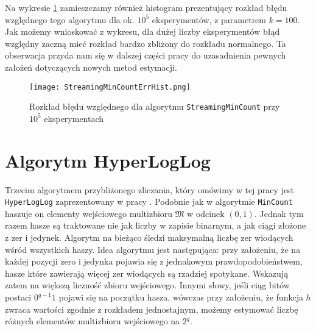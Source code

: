 Na wykresie \ref{fig:str_mincount_hist} zamieszczamy również histogram prezentujący rozkład błędu względnego tego algorytmu dla ok. $10^5$ eksperymentów, z parametrem $k=100$. Jak możemy wnioskować z wykresu, dla dużej liczby eksperymentów błąd względny zaczną mieć rozkład bardzo zbliżony do rozkładu normalnego. Ta obserwacja przyda nam się w dalszej części pracy do uzasadnienia pewnych założeń dotyczących nowych metod estymacji.

\begin{figure}[h!]
	\texttt{[image: StreamingMinCountErrHist.png]}
	\centering
	\caption{Rozkład błędu względnego dla algorytmu \texttt{StreamingMinCount} przy $10^5$ eksperymentach}
	\label{fig:str_mincount_hist}
\end{figure}

\section{Algorytm HyperLogLog}
\label{hll}

Trzecim algorytmem przybliżonego zliczania, który omówimy w tej pracy jest \texttt{HyperLogLog} zaprezentowany w pracy \cite{hll}. Podobnie jak w algorytmie \texttt{MinCount}  haszuje on elementy wejściowego  multizbioru $\mathfrak{M}$ w odcinek $(0,1)$. Jednak tym razem hasze są traktowane nie jak liczby w zapisie binarnym, a jak ciągi złożone z zer i jedynek. Algorytm na bieżąco śledzi maksymalną liczbę zer wiodących wśród wszystkich haszy. Idea algorytmu jest następująca: przy założeniu, że na każdej pozycji zero i jedynka pojawia się z jednakowym prawdopodobieństwem,  hasze które zawierają więcej zer wiodących są rzadziej spotykane. Wskazują zatem na większą liczność zbioru wejściowego. Innymi słowy, jeśli ciąg bitów postaci $0^{q-1}1$ pojawi się na początku hasza, wówczas przy założeniu, że funkcja $h$ zwraca wartości zgodnie z rozkładem jednostajnym, możemy estymować liczbę różnych elementów multizbioru wejściowego na $2^{q}$.

